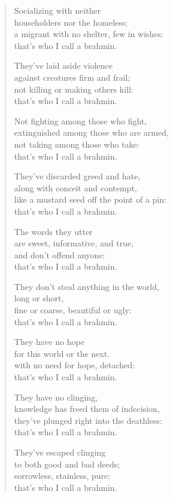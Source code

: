 \documentclass[12pt,openany]{book}%
\begin{document}
\begin{verse}
Socializing with neither \\
householders nor the homeless; \\
a migrant with no shelter, few in wishes: \\
that’s who I call a brahmin. 

They’ve laid aside violence \\
against creatures firm and frail; \\
not killing or making others kill: \\
that’s who I call a brahmin. 

Not fighting among those who fight, \\
extinguished among those who are armed, \\
not taking among those who take: \\
that’s who I call a brahmin. 

They’ve discarded greed and hate, \\
along with conceit and contempt, \\
like a mustard seed off the point of a pin: \\
that’s who I call a brahmin. 

The words they utter \\
are sweet, informative, and true, \\
and don’t offend anyone: \\
that’s who I call a brahmin. 

They don’t steal anything in the world, \\
long or short, \\
fine or coarse, beautiful or ugly: \\
that’s who I call a brahmin. 

They have no hope \\
for this world or the next. \\
with no need for hope, detached: \\
that’s who I call a brahmin. 

They have no clinging, \\
knowledge has freed them of indecision, \\
they’ve plunged right into the deathless: \\
that’s who I call a brahmin. 

They’ve escaped clinging \\
to both good and bad deeds; \\
sorrowless, stainless, pure: \\
that’s who I call a brahmin. 


\end{verse}
\end{document}
